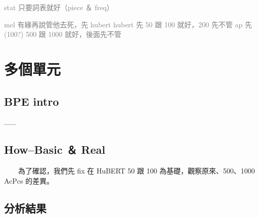 
\textcolor{gray}{stat 只要詞表就好（piece ＆ freq）}

\textcolor{gray}{mel 有緣再說管他去死，先 hubert}
\textcolor{gray}{hubert 先 50 跟 100 就好，200 先不管}
\textcolor{gray}{ap  先 (100?) 500 跟 1000 就好，後面先不管}

\chapter{多個單元} \cite{-}

\section{BPE intro} 
        ......

\section{How--Basic ＆ Real}
　　為了確認，我們先 fix 在 HuBERT 50 跟 100 為基礎，觀察原來、500、1000 AcPcs 的差異。

\section{分析結果}

